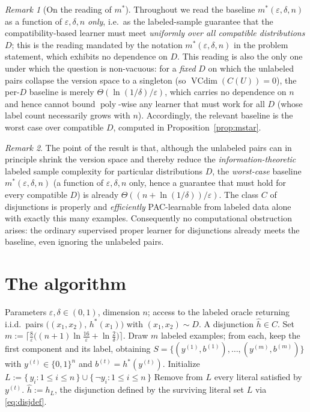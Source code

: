 \documentclass{amsart}
\theoremstyle{definition}
\theoremstyle{remark}
\newtheorem{remark}{Remark}
\newcommand{\eps}{\varepsilon}
\DeclareMathOperator{\VCdim}{VCdim}
\DeclareMathOperator{\poly}{poly}
\begin{document}
\begin{remark}[On the reading of $m^*$]
Throughout we read the baseline $m^*(\eps,\delta,n)$ as a function of
$\eps,\delta,n$ \emph{only}, i.e.\ as the labeled-sample guarantee that the
compatibility-based learner must meet \emph{uniformly over all compatible
distributions} $D$; this is the reading mandated by the notation
$m^*(\eps,\delta,n)$ in the problem statement, which exhibits no dependence on
$D$. This reading is also the only one under which the question is non-vacuous:
for a \emph{fixed} $D$ on which the unlabeled pairs collapse the version space to
a singleton (so $\VCdim(C(U))=0$), the per-$D$ baseline is merely
$\Theta(\ln(1/\delta)/\eps)$, which carries no dependence on $n$ and hence
cannot bound $\poly$-wise any learner that must work for all $D$ (whose label
count necessarily grows with $n$). Accordingly, the relevant baseline is the
worst case over compatible $D$, computed in Proposition~\ref{prop:mstar}.
\end{remark}

\begin{remark}
The point of the result is that, although the unlabeled pairs can in principle
shrink the version space and thereby reduce the \emph{information-theoretic}
labeled sample complexity for particular distributions $D$, the
\emph{worst-case} baseline $m^*(\eps,\delta,n)$ (a function of $\eps,\delta,n$
only, hence a guarantee that must hold for every compatible $D$) is already
$\Theta((n+\ln(1/\delta))/\eps)$. The class $C$ of disjunctions is properly and
\emph{efficiently} PAC-learnable from labeled data alone with exactly this many
examples. Consequently no computational obstruction arises: the ordinary
supervised proper learner for disjunctions already meets the baseline, even
ignoring the unlabeled pairs.
\end{remark}

\section{The algorithm}

\begin{algorithm}[h]
\caption{Efficient semi-supervised learner for disjunctions}
\label{alg:learn}
\begin{algorithmic}[1]
\Require Parameters $\eps,\delta\in(0,1)$, dimension $n$; access to the labeled
oracle returning i.i.d.\ pairs $\big((x_1,x_2),\,h^*(x_1)\big)$ with
$(x_1,x_2)\sim D$.
\Ensure A disjunction $\hat h\in C$.
\State Set $m:=\big\lceil \tfrac{8}{\eps}\big((n+1)\ln\tfrac{16}{\eps}+\ln\tfrac{2}{\delta}\big)\big\rceil$.
\State Draw $m$ labeled examples; from each, keep the first component and its
label, obtaining $S=\{(y^{(1)},b^{(1)}),\dots,(y^{(m)},b^{(m)})\}$ with
$y^{(t)}\in\{0,1\}^n$ and $b^{(t)}=h^*(y^{(t)})$.
\State Initialize $L:=\{\,y_i : 1\le i\le n\,\}\cup\{\,\lnot y_i : 1\le i\le n\,\}$
    \State Remove from $L$ every literal satisfied by $y^{(t)}$.
  \EndIf
\EndFor
\State \Return $\hat h:=h_L$, the disjunction defined by the surviving literal
set $L$ via \eqref{eq:disjdef}.
\end{algorithmic}
\end{algorithm}
\end{document}
